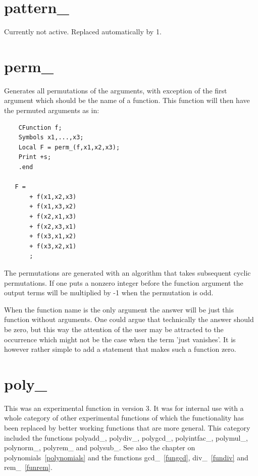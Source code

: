 
\section{pattern\_}
\label{funpattern}
\noindent Currently not active. Replaced automatically by 1.


\section{perm\_}
\label{funperm}
\noindent Generates all permutations of the arguments, with exception 
of the first argument which should be the name of a function. This function 
will then have the permuted arguments as in:
\begin{verbatim}
    CFunction f;
    Symbols x1,...,x3;
    Local F = perm_(f,x1,x2,x3);
    Print +s;
    .end

   F =
       + f(x1,x2,x3)
       + f(x1,x3,x2)
       + f(x2,x1,x3)
       + f(x2,x3,x1)
       + f(x3,x1,x2)
       + f(x3,x2,x1)
       ;
\end{verbatim}
The permutations are generated with an algorithm that takes subsequent 
cyclic permutations. If one puts a nonzero integer before the function 
argument the output terms will be multiplied by -1 when the permutation is 
odd.

When the function name is the only argument the answer will be just this 
function without arguments. One could argue that technically the answer 
should be zero, but this way the attention of the user may be attracted to 
the occurrence which might not be the case when the term 'just vanishes'. 
It is however rather simple to add a statement that makes such a function 
zero.


\section{poly\_}
\label{funpoly}
\noindent This was an experimental function in version 3. It was for 
internal use with a whole category of other experimental functions of which 
the functionality has been replaced by better working functions that are 
more general. This category included the functions 
polyadd\_,
polydiv\_,
polygcd\_,
polyintfac\_,
polymul\_,
polynorm\_,
polyrem\_ and
polysub\_.
See also the chapter on polynomials~\ref{polynomials} and the functions 
gcd\_~\ref{fungcd}, div\_~\ref{fundiv} and rem\_~\ref{funrem}.

